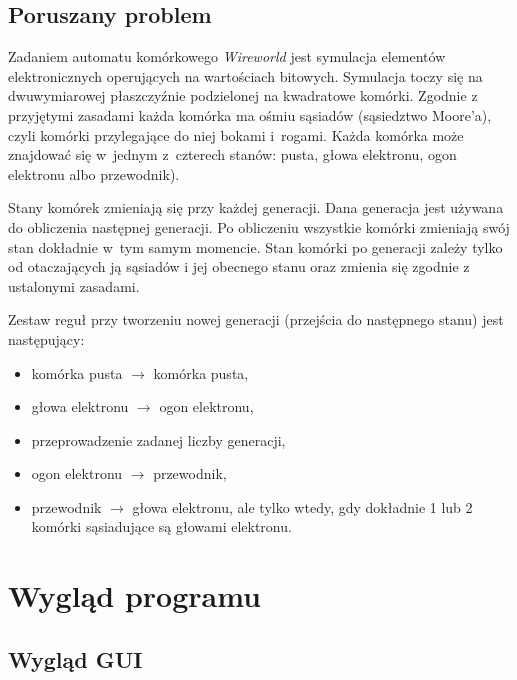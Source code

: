 \documentclass[a4paper,12pt,oneside]{article}
\begin{document}
\subsection{Poruszany problem}
Zadaniem automatu komórkowego \textit{Wireworld} jest symulacja elementów elektronicznych operujących na wartościach bitowych. Symulacja toczy się na dwuwymiarowej płaszczyźnie podzielonej na kwadratowe komórki. Zgodnie z przyjętymi zasadami każda komórka ma ośmiu sąsiadów (sąsiedztwo Moore'a), czyli komórki przylegające do niej bokami i~rogami. Każda komórka może znajdować się w~jednym z~czterech stanów: pusta, głowa elektronu, ogon elektronu albo przewodnik). 
\par Stany komórek zmieniają się przy każdej generacji. Dana generacja jest używana do obliczenia następnej generacji. Po obliczeniu wszystkie komórki zmieniają swój stan dokładnie w~tym samym momencie. Stan komórki po generacji zależy tylko od otaczających ją sąsiadów i jej obecnego stanu oraz zmienia się zgodnie z ustalonymi zasadami.






\par Zestaw reguł przy tworzeniu nowej generacji (przejścia do następnego stanu) jest następujący:

\begin{itemize}
\item  komórka pusta $\rightarrow$ komórka pusta,

\item  głowa elektronu $\rightarrow$ ogon elektronu,

\item  przeprowadzenie zadanej liczby generacji,
\item  ogon elektronu $\rightarrow$ przewodnik,

\item przewodnik $\rightarrow$ głowa elektronu, ale tylko wtedy, gdy dokładnie 1 lub 2 komórki sąsiadujące są głowami elektronu.
\end{itemize}

\section{Wygląd programu}
\subsection{Wygląd GUI}
\end{document}
